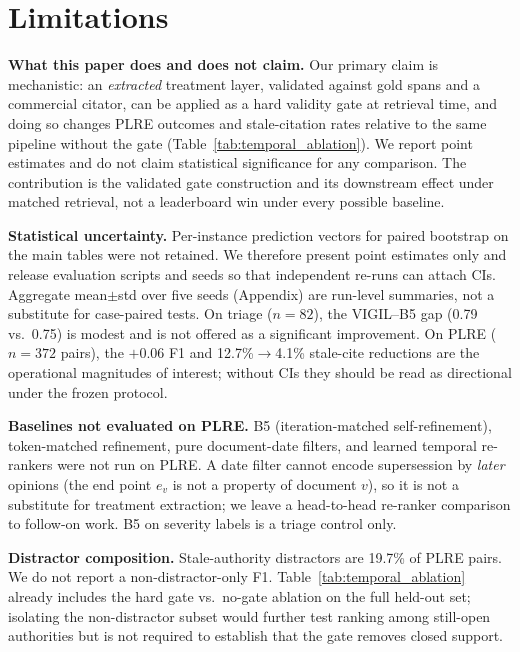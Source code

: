 \section*{Limitations}
\label{sec:limitations}

\textbf{What this paper does and does not claim.}
Our primary claim is mechanistic: an \emph{extracted} treatment layer, validated against gold spans and a commercial citator, can be applied as a hard validity gate at retrieval time, and doing so changes PLRE outcomes and stale-citation rates relative to the same pipeline without the gate (Table~\ref{tab:temporal_ablation}). We report point estimates and do not claim statistical significance for any comparison. The contribution is the validated gate construction and its downstream effect under matched retrieval, not a leaderboard win under every possible baseline.

\textbf{Statistical uncertainty.}
Per-instance prediction vectors for paired bootstrap on the main tables were not retained. We therefore present point estimates only and release evaluation scripts and seeds so that independent re-runs can attach CIs. Aggregate mean$\pm$std over five seeds (Appendix) are run-level summaries, not a substitute for case-paired tests. On triage ($n{=}82$), the VIGIL--B5 gap (0.79 vs.\ 0.75) is modest and is not offered as a significant improvement. On PLRE ($n{=}372$ pairs), the $+$0.06 F1 and 12.7\%$\rightarrow$4.1\% stale-cite reductions are the operational magnitudes of interest; without CIs they should be read as directional under the frozen protocol.

\textbf{Baselines not evaluated on PLRE.}
B5 (iteration-matched self-refinement), token-matched refinement, pure document-date filters, and learned temporal re-rankers were not run on PLRE. A date filter cannot encode supersession by \emph{later} opinions (the end point $e_v$ is not a property of document $v$), so it is not a substitute for treatment extraction; we leave a head-to-head re-ranker comparison to follow-on work. B5 on severity labels is a triage control only.

\textbf{Distractor composition.}
Stale-authority distractors are 19.7\% of PLRE pairs. We do not report a non-distractor-only F1. Table~\ref{tab:temporal_ablation} already includes the hard gate vs.\ no-gate ablation on the full held-out set; isolating the non-distractor subset would further test ranking among still-open authorities but is not required to establish that the gate removes closed support.

